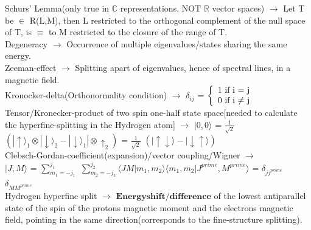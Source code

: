 \documentclass[10pt,fancy]{elegantbook}
\begin{document}
{\begin{definition}
Schurs' Lemma(only true in $\mathbb C$ representations, NOT $\mathbb R$ vector spaces) $\longrightarrow$ Let T be $\in$ R(L,M), then L restricted to the orthogonal complement of the null space
of T, is $\equiv$ to M restricted to the closure of the range of T.  \\
  
Degeneracy $\longrightarrow$ Occurrence of multiple eigenvalues/states sharing the same energy. \\ 

Zeeman-effect $\longrightarrow$ Splitting apart of eigenvalues, hence of spectral lines, in a magnetic field. \\
  
Kronocker-delta(Orthonormality condition) $\longrightarrow$ $\delta_{ij}$ = $\left\{
\begin{array}{ll}
1 \text{ if i = j}  \\
0 \text{ if i $\neq$ j} \\
\end{array} \\
\right.$ \\
 
Tensor/Kronecker-product of two spin one-half state space[needed to calculate the hyperfine-splitting in the Hydrogen atom]
$\longrightarrow$ $ | 0, 0 \rangle$ =  
$\frac{1}{\sqrt 2}$ $\left( | \uparrow \rangle_1 \otimes | \downarrow \rangle_2 -  | \downarrow \rangle_1 |  \otimes \uparrow_2 \right)$ = $\frac{1}{\sqrt 2}$ $\left( | \uparrow \downarrow \rangle - | \downarrow \uparrow \rangle \right)$  \\
  
Clebsch-Gordan-coefficient(expansion)/vector coupling/Wigner $\longrightarrow$ \\ 
$ | J,M \rangle$ = $\sum_{m_1 = {-j_1}}^{j_1}$ $\sum_{m_2 = {-j_2}}^{j_2} \langle{JM} | {m_1,m_2} \rangle \langle{m_1,m_2} |J^{prime},M^{prime} \rangle$ = $\delta_{jj^{prime}}$ $\delta_{MM^{prime}}$  \\
  
    
Hydrogen hyperfine split $\longrightarrow$ $\mathbf{Energy shift/difference}$ of the lowest antiparallel state of the spin of the protons magnetic moment and the electrons magnetic field, pointing in the same direction(corresponds to the fine-structure splitting).  \\  
    

\end{definition}}
\end{document}
